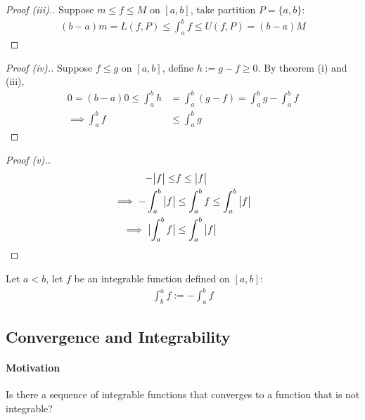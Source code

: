\documentclass[11pt]{article}
\begin{document}
	\begin{proof}[Proof (iii).]
		Suppose $m \leq f \leq M$ on $[a, b]$, take partition $P=\{a, b\}$:
		\begin{align}
			(b-a)m = L(f, P) \leq \int_a^b f \leq U(f, P) = (b-a)M
		\end{align}
	\end{proof}
	
	\begin{proof}[Proof (iv).]
		Suppose $f \leq g$ on $[a, b]$, define $h := g - f \geq 0$. By theorem (i) and (iii), 
		\begin{align}
			0 = (b-a) 0 \leq \int_a^b h &= \int_a^b (g - f) = \int_a^b g - \int_a^b f \\
			\implies \int_a^b f &\leq \int_a^b g
		\end{align}
	\end{proof}
	
	\begin{proof}[Proof (v).]
		\begin{align}
			-\big \vert {f} \big \vert \leq &f \leq \big \vert {f} \big \vert \\
			\implies - \int_a^b \big \vert {f} \big \vert &\leq \int_a^b f \leq \int_a^b \big \vert {f} \big \vert \\
			\implies \big \vert {\int_a^b f} \big \vert &\leq \int_a^b \big \vert {f} \big \vert
		\end{align}
	\end{proof}
	
	\begin{definition}
		Let $a < b$, let $f$ be an integrable function defined on $[a, b]$:
		\begin{align}
			\int_b^a f := - \int_a^b f
		\end{align}
	\end{definition}
	
	\subsection{Convergence and Integrability}
	\paragraph{Motivation} Is there a sequence of integrable functions that converges to a function that is not integrable?
	
\end{document}
